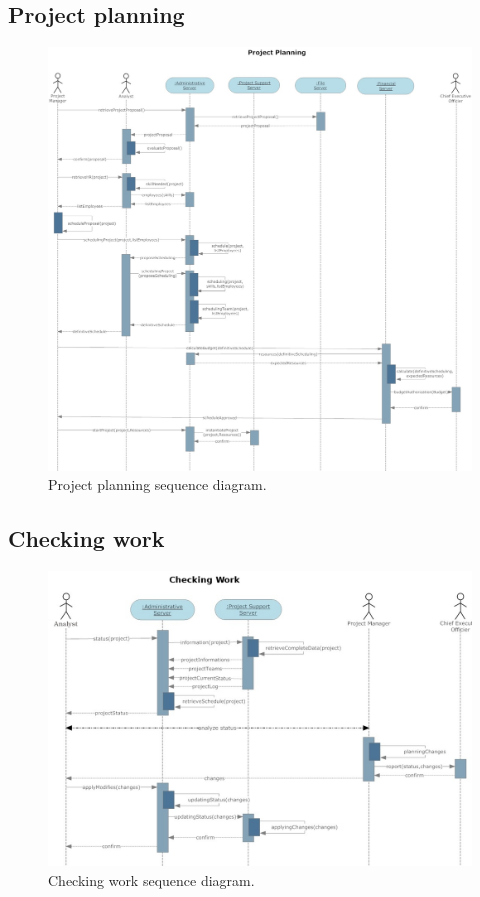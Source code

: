 \subsection{Project planning}
\begin{figure}
\begin{centering}
\includegraphics[scale=0.30,angle=90]{assign3/sdraw/imgs/project_planning.jpg}
\caption{Project planning sequence diagram.}
\label{3img:[sequence]project_planning}
\end{centering}
\end{figure}

\subsection{Checking work}
\begin{figure}
\begin{centering}
\includegraphics[scale=0.35]{assign3/sdraw/imgs/checking.jpg}
\caption{Checking work sequence diagram.}
\label{3img:[sequence]checking}
\end{centering}
\end{figure}

